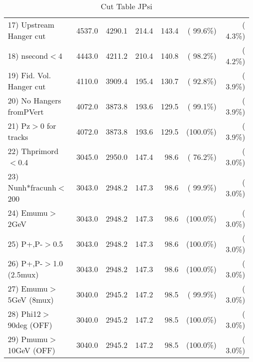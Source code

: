 \begin{table}[h!]
\begin{tabular}{||l||r|r|r|r|r|r||}
 17) Upstream Hanger cut  &       4537.0 &       4290.1 &        214.4 &        143.4 & ( 99.6\%) & (  4.3\%) \\
 18) nsecond$<$4          &       4443.0 &       4211.2 &        210.4 &        140.8 & ( 98.2\%) & (  4.2\%) \\
 19) Fid. Vol. Hanger cut &       4110.0 &       3909.4 &        195.4 &        130.7 & ( 92.8\%) & (  3.9\%) \\
 20) No Hangers fromPVert &       4072.0 &       3873.8 &        193.6 &        129.5 & ( 99.1\%) & (  3.9\%) \\
 21) Pz$>$0 for tracks    &       4072.0 &       3873.8 &        193.6 &        129.5 & (100.0\%) & (  3.9\%) \\
 22) Thprimord$<$0.4      &       3045.0 &       2950.0 &        147.4 &         98.6 & ( 76.2\%) & (  3.0\%) \\
 23) Nunh*fracunh$<$200   &       3043.0 &       2948.2 &        147.3 &         98.6 & ( 99.9\%) & (  3.0\%) \\
 24) Emumu$>$2GeV         &       3043.0 &       2948.2 &        147.3 &         98.6 & (100.0\%) & (  3.0\%) \\
 25) P+,P-$>$0.5          &       3043.0 &       2948.2 &        147.3 &         98.6 & (100.0\%) & (  3.0\%) \\
 26) P+,P-$>$1.0 (2.5mux) &       3043.0 &       2948.2 &        147.3 &         98.6 & (100.0\%) & (  3.0\%) \\
 27) Emumu$>$5GeV  (8mux) &       3040.0 &       2945.2 &        147.2 &         98.5 & ( 99.9\%) & (  3.0\%) \\
 28) Phi12$>$90deg  (OFF) &       3040.0 &       2945.2 &        147.2 &         98.5 & (100.0\%) & (  3.0\%) \\
 29) Pmumu$>$10GeV  (OFF) &       3040.0 &       2945.2 &        147.2 &         98.5 & (100.0\%) & (  3.0\%) \\
 \hline
 \hline
 \end{tabular}
 \caption{Cut Table  JPsi     }
 \label{tab-cutcohjpsi-mumu_cohrhop}
 \end{table}
